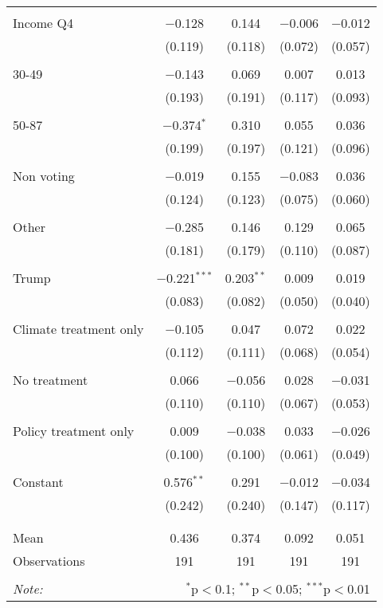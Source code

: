 \begin{tabular}{@{\extracolsep{5pt}}lcccc}
  & & & & \\ 
 Income Q4 & $-$0.128 & 0.144 & $-$0.006 & $-$0.012 \\ 
  & (0.119) & (0.118) & (0.072) & (0.057) \\ 
  & & & & \\ 
 30-49 & $-$0.143 & 0.069 & 0.007 & 0.013 \\ 
  & (0.193) & (0.191) & (0.117) & (0.093) \\ 
  & & & & \\ 
 50-87 & $-$0.374$^{*}$ & 0.310 & 0.055 & 0.036 \\ 
  & (0.199) & (0.197) & (0.121) & (0.096) \\ 
  & & & & \\ 
 Non voting & $-$0.019 & 0.155 & $-$0.083 & 0.036 \\ 
  & (0.124) & (0.123) & (0.075) & (0.060) \\ 
  & & & & \\ 
 Other & $-$0.285 & 0.146 & 0.129 & 0.065 \\ 
  & (0.181) & (0.179) & (0.110) & (0.087) \\ 
  & & & & \\ 
 Trump & $-$0.221$^{***}$ & 0.203$^{**}$ & 0.009 & 0.019 \\ 
  & (0.083) & (0.082) & (0.050) & (0.040) \\ 
  & & & & \\ 
 Climate treatment only & $-$0.105 & 0.047 & 0.072 & 0.022 \\ 
  & (0.112) & (0.111) & (0.068) & (0.054) \\ 
  & & & & \\ 
 No treatment & 0.066 & $-$0.056 & 0.028 & $-$0.031 \\ 
  & (0.110) & (0.110) & (0.067) & (0.053) \\ 
  & & & & \\ 
 Policy treatment only & 0.009 & $-$0.038 & 0.033 & $-$0.026 \\ 
  & (0.100) & (0.100) & (0.061) & (0.049) \\ 
  & & & & \\ 
 Constant & 0.576$^{**}$ & 0.291 & $-$0.012 & $-$0.034 \\ 
  & (0.242) & (0.240) & (0.147) & (0.117) \\ 
  & & & & \\ 
\hline \\[-1.8ex] 
Mean & 0.436 & 0.374 & 0.092 & 0.051 \\ 
Observations & 191 & 191 & 191 & 191 \\ 
\hline 
\hline \\[-1.8ex] 
\textit{Note:}  & \multicolumn{4}{r}{$^{*}$p$<$0.1; $^{**}$p$<$0.05; $^{***}$p$<$0.01} \\ 
\end{tabular} 
